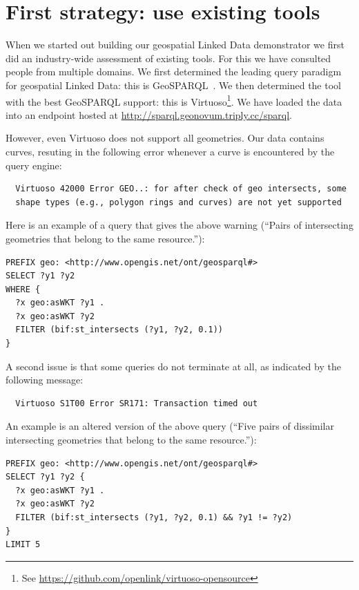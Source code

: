 \documentclass[a4paper]{scrartcl}
\begin{document}
\section{First strategy: use existing tools}

When we started out building our geospatial Linked Data demonstrator
we first did an industry-wide assessment of existing tools.  For this
we have consulted people from multiple domains.  We first determined
the leading query paradigm for geospatial Linked Data: this is
GeoSPARQL~\cite{Battle2011}.  We then determined the tool with the
best GeoSPARQL support: this is Virtuoso\footnote{See
  \url{https://github.com/openlink/virtuoso-opensource}}.  We have
loaded the data into an endpoint hosted at
\url{http://sparql.geonovum.triply.cc/sparql}.

However, even Virtuoso does not support all geometries.  Our data
contains curves, resuting in the following error whenever a curve is
encountered by the query engine:

\begin{lstlisting}
  Virtuoso 42000 Error GEO..: for after check of geo intersects, some
  shape types (e.g., polygon rings and curves) are not yet supported
\end{lstlisting}

Here is an example of a query that gives the above warning (``Pairs of
intersecting geometries that belong to the same resource.''):

\begin{verbatim}
PREFIX geo: <http://www.opengis.net/ont/geosparql#>
SELECT ?y1 ?y2
WHERE {
  ?x geo:asWKT ?y1 .
  ?x geo:asWKT ?y2
  FILTER (bif:st_intersects (?y1, ?y2, 0.1))
}
\end{verbatim}

A second issue is that some queries do not terminate at all, as
indicated by the following message:

\begin{lstlisting}
  Virtuoso S1T00 Error SR171: Transaction timed out
\end{lstlisting}

An example is an altered version of the above query (``Five pairs of
dissimilar intersecting geometries that belong to the same
resource.''):

\begin{verbatim}
PREFIX geo: <http://www.opengis.net/ont/geosparql#>
SELECT ?y1 ?y2 {
  ?x geo:asWKT ?y1 .
  ?x geo:asWKT ?y2
  FILTER (bif:st_intersects (?y1, ?y2, 0.1) && ?y1 != ?y2)
}
LIMIT 5
\end{verbatim}
\end{document}
